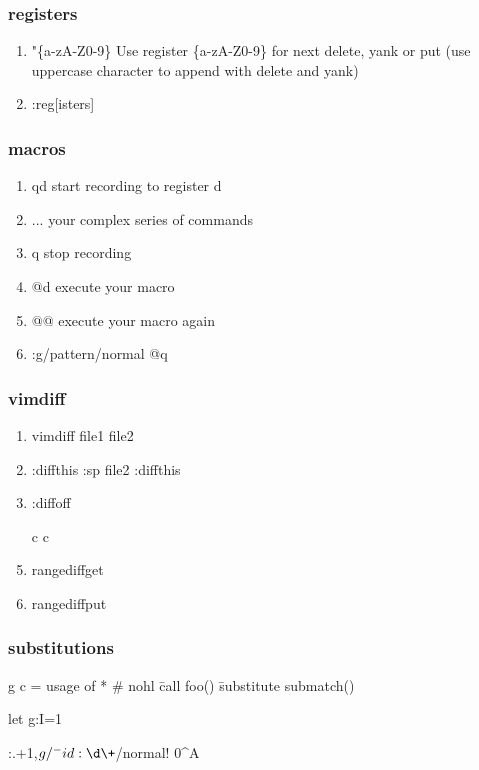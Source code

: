 \documentclass{beamer}
\begin{document}
\begin{frame}
  \frametitle{registers}

  \begin{enumerate}
    \item "\{a-zA-Z0-9\}	Use register \{a-zA-Z0-9\} for next delete, yank or put (use uppercase character to append with delete and yank)
    \item :reg[isters]
  \end{enumerate}
\end{frame}

\begin{frame}
  \frametitle{macros}
  \begin{enumerate}
    \item qd 	start recording to register d
    \item ... 	your complex series of commands
    \item q 	stop recording
    \item @d 	execute your macro
    \item @@ 	execute your macro again
    \item :g/pattern/normal @q
  \end{enumerate}
\end{frame}

\begin{frame}
  \frametitle{vimdiff}
  \begin{enumerate}
    \item vimdiff file1 file2
    \item :diffthis :sp file2 :diffthis
    \item :diffoff
    \item [c ]c
    \item rangediffget
    \item rangediffput
  \end{enumerate}
\end{frame}

\begin{frame}
  \frametitle{substitutions}
      g c
      =
      usage of * \#
      nohl
      \= call foo()
      \= substitute
      submatch()

let g:I=1

:.+1,$g/^- id: \d\+$/normal! 0^A

\end{frame}
\end{document}
